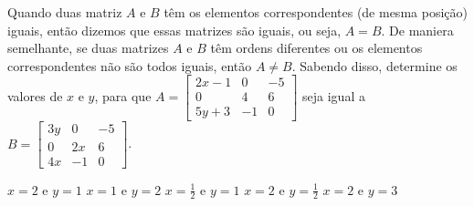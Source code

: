Quando duas matriz $A$ e $B$ têm os elementos correspondentes (de mesma posição) iguais, então dizemos que essas matrizes são iguais, ou seja, $A=B$. De maniera semelhante, se duas matrizes $A$ e $B$ têm ordens diferentes ou os elementos correspondentes não são todos iguais, então $A\neq B$. Sabendo disso, determine os valores de $x$ e $y$, para que $A=\left[ \begin{array}{ccc}
2x-1 & 0 & -5 \\
0 & 4 & 6 \\
5y+3 & -1 & 0
\end{array} \right] $ seja igual a $B= \left[ \begin{array}{ccc}
3y & 0 & -5 \\
0 & 2x & 6 \\
4x & -1 & 0
\end{array} \right]$.

$x=2$ e $y=1$
$x=1$ e $y=2$
$x=\frac{1}{2}$ e $y=1$
$x=2$ e $y=\frac{1}{2}$
$x=2$ e $y=3$


